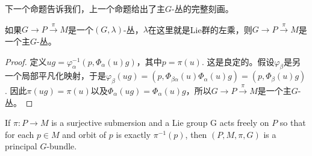 下一个命题告诉我们，上一个命题给出了主$G$-丛的完整刻画。

\begin{pro}
如果$G\to P\xrightarrow{\pi}M$是一个$(G,\lambda)$-丛，$\lambda$在这里就是Lie群的左乘，则$G\to P\xrightarrow{\pi}M$是一个主$G$-丛。
\end{pro}

\begin{proof}
定义$ug=\varphi_{\alpha}^{-1}(p,\Phi_{\alpha}(u)g)$，其中$p=\pi(u)$. 这是良定的。假设$\varphi_\beta$是另一个局部平凡化映射，于是$\varphi_\beta(ug)=(p,\Phi_{\beta\alpha}(u)\Phi_\alpha(u)g)=(p,\Phi_{\beta}(u)g)$. 因此$\pi(ug)=\pi(u)$以及$\Phi_{\alpha}(ug)=\Phi_{\alpha}(u)g$，所以$G\to P\xrightarrow{\pi}M$是一个主$G$-丛。
\end{proof}


\begin{thm}
If $\pi:P\to M$ is a surjective submersion and a Lie group G acts freely on $P$ so that for each $p\in M$ and orbit of $p$ is exactly $\pi^{-1}(p)$, then $(P,M,\pi,G)$ is a principal $G$-bundle.
\end{thm}

